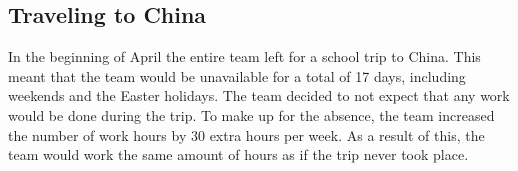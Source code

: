 \subsection{Traveling to China}
In the beginning of April the entire team left for a school trip to China. This meant that the team would be unavailable for a total of 17 days, including weekends and the Easter holidays. The team decided to not expect that any work would be done during the trip. To make up for the absence, the team increased the number of work hours by 30 extra hours per week. As a result of this, the team would work the same amount of hours as if the trip never took place.
